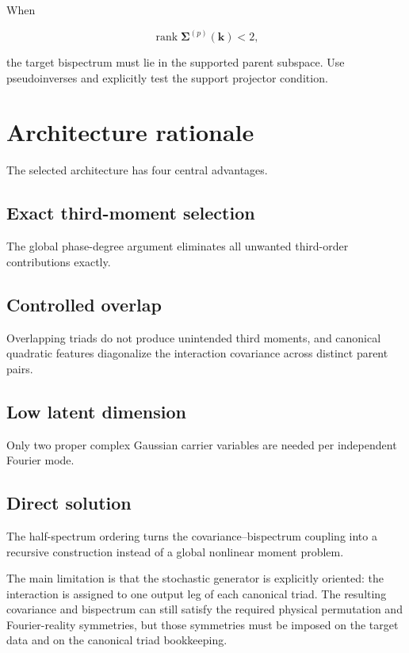 \documentclass[
  11pt,
  a4paper,
]{article}
\begin{document}
When

\[
\operatorname{rank}
\boldsymbol\Sigma^{(p)}(\boldsymbol k)<2,
\]

the target bispectrum must lie in the supported parent subspace. Use
pseudoinverses and explicitly test the support projector condition.

\section{Architecture rationale}\label{architecture-rationale}

The selected architecture has four central advantages.

\subsection{Exact third-moment
selection}\label{exact-third-moment-selection}

The global phase-degree argument eliminates all unwanted third-order
contributions exactly.

\subsection{Controlled overlap}\label{controlled-overlap}

Overlapping triads do not produce unintended third moments, and
canonical quadratic features diagonalize the interaction covariance
across distinct parent pairs.

\subsection{Low latent dimension}\label{low-latent-dimension}

Only two proper complex Gaussian carrier variables are needed per
independent Fourier mode.

\subsection{Direct solution}\label{direct-solution}

The half-spectrum ordering turns the covariance--bispectrum coupling
into a recursive construction instead of a global nonlinear moment
problem.

The main limitation is that the stochastic generator is explicitly
oriented: the interaction is assigned to one output leg of each
canonical triad. The resulting covariance and bispectrum can still
satisfy the required physical permutation and Fourier-reality
symmetries, but those symmetries must be imposed on the target data and
on the canonical triad bookkeeping.
\end{document}
